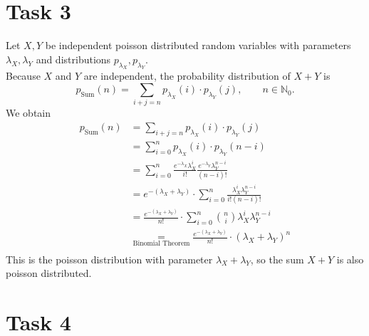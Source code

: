 \documentclass[%
   11pt,              %
   ngerman,           %
   a4paper,           %
   DIV11,             %
]{scrartcl}%
\begin{document}
\section*{Task 3}
Let $X, Y$ be independent poisson distributed random variables with parameters $\lambda_X, \lambda_Y$ and distributions $p_{\lambda_X}, p_{\lambda_Y}$. \\
Because $X$ and $Y$ are independent, the probability distribution of $X+Y$ is
\begin{equation*}
	p_\text{Sum}(n) = \sum_{i+j=n} p_{\lambda_X}(i) \cdot p_{\lambda_Y}(j), \qquad n \in \mathbb{N}_0.
\end{equation*} 
We obtain
\begin{align*}
	p_\text{Sum}(n) &= \sum_{i+j=n} p_{\lambda_X}(i) \cdot p_{\lambda_Y}(j) \\
	&= \sum_{i=0}^n p_{\lambda_X}(i) \cdot p_{\lambda_Y}(n-i) \\
	&= \sum_{i=0}^n \frac{e^{-\lambda_X}\lambda_X^i}{i!} \frac{e^{-\lambda_Y}\lambda_Y^{n-i}}{(n-i)!} \\
	&= e^{-(\lambda_X + \lambda_Y)} \cdot \sum_{i=0}^n  \frac{\lambda_X^i\lambda_Y^{n-i}}{i!(n-i)!} \\
	&= \frac{e^{-(\lambda_X + \lambda_Y)}}{n!} \cdot \sum_{i=0}^n  {n \choose i} \lambda_X^i\lambda_Y^{n-i} \\
	&\underset{\text{Binomial Theorem}}{=} \frac{e^{-(\lambda_X + \lambda_Y)}}{n!} \cdot (\lambda_X + \lambda_Y)^n \\
\end{align*}
This is the poisson distribution with parameter $\lambda_X + \lambda_Y$, so the sum $X + Y$ is also poisson distributed.
\section*{Task 4}
\end{document}
